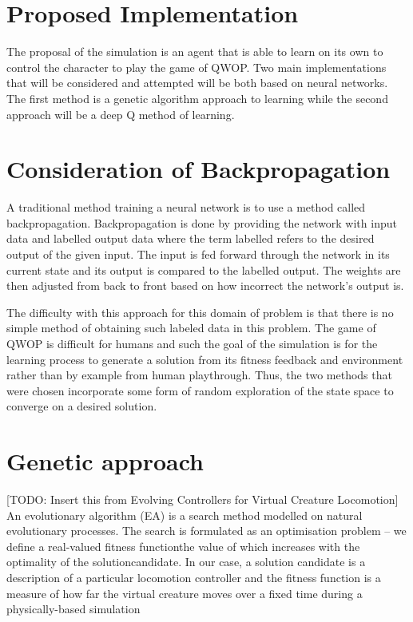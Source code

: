 \documentclass[letterpaper]{article} %
\begin{document}
\section{Proposed Implementation}

The proposal of the simulation is an agent that is able to learn on its own to control the character to play the game of QWOP. Two main implementations that will be considered and attempted will be both based on neural networks. The first method is a genetic algorithm approach to learning while the second approach will be a deep Q method of learning.

\section{Consideration of Backpropagation}

A traditional method training a neural network is to use a method called backpropagation. Backpropagation is done by providing the network with input data and labelled output data where the term labelled refers to the desired output of the given input. The input is fed forward through the network in its current state and its output is compared to the labelled output. The weights are then adjusted from back to front based on how incorrect the network's output is. 

\par The difficulty with this approach for this domain of problem is that there is no simple method of obtaining such labeled data in this problem. The game of QWOP is difficult for humans and such the goal of the simulation is for the learning process to generate a solution from its fitness feedback and environment rather than by example from human playthrough. Thus, the two methods that were chosen incorporate some form of random exploration of the state space to converge on a desired solution.

\section{Genetic approach}
[TODO: Insert this from Evolving Controllers for Virtual Creature Locomotion] An evolutionary algorithm (EA) is a search method modelled on natural evolutionary processes. The search is formulated as an optimisation problem – we define a real-valued fitness functionthe value of which increases with the optimality of the solutioncandidate. In our case, a solution candidate is a description of a particular locomotion controller and the fitness function is a measure of how far the virtual creature moves over a fixed time during a physically-based simulation
\end{document}
